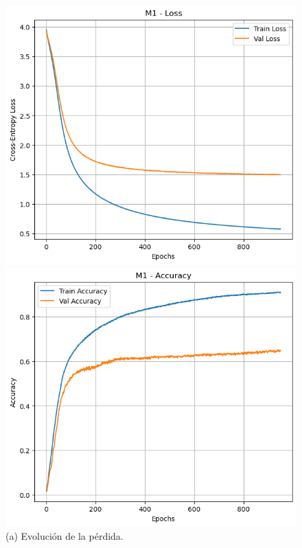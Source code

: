 \documentclass[11pt]{article}
\begin{document}
\begin{figure}[H]
    \centering
    \begin{minipage}[t]{0.32\textwidth}
        \centering
        \includegraphics[width=\linewidth]{figures/loss_m1.png}
        \caption*{(a) Evolución de la pérdida.}
    \end{minipage}
    \hfill
    \begin{minipage}[t]{0.32\textwidth}
        \centering
        \includegraphics[width=\linewidth]{figures/acc_m1.png}

\end{minipage}
\end{figure}
\end{document}
